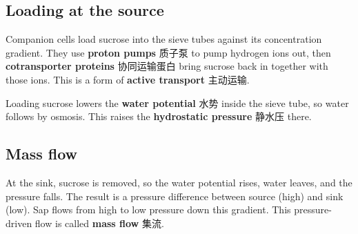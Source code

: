 \documentclass[11pt]{article}
\begin{document}
\subsection*{Loading at the source}

Companion cells load sucrose into the sieve tubes against its concentration gradient. They use \textbf{proton pumps} 质子泵 to pump hydrogen ions out, then \textbf{cotransporter proteins} 协同运输蛋白 bring sucrose back in together with those ions. This is a form of \textbf{active transport} 主动运输.

Loading sucrose lowers the \textbf{water potential} 水势 inside the sieve tube, so water follows by osmosis. This raises the \textbf{hydrostatic pressure} 静水压 there.

\subsection*{Mass flow}

At the sink, sucrose is removed, so the water potential rises, water leaves, and the pressure falls. The result is a pressure difference between source (high) and sink (low). Sap flows from high to low pressure down this gradient. This pressure-driven flow is called \textbf{mass flow} 集流.
\end{document}
